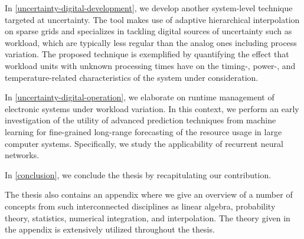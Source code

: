 In \cref{uncertainty-digital-development}, we develop another system-level
technique targeted at uncertainty. The tool makes use of adaptive hierarchical
interpolation on sparse grids and specializes in tackling digital sources of
uncertainty such as workload, which are typically less regular than the analog
ones including process variation. The proposed technique is exemplified by
quantifying the effect that workload units with unknown processing times have on
the timing-, power-, and temperature-related characteristics of the system under
consideration.

In \cref{uncertainty-digital-operation}, we elaborate on runtime management of
electronic systems under workload variation. In this context, we perform an
early investigation of the utility of advanced prediction techniques from
machine learning for fine-grained long-range forecasting of the resource usage
in large computer systems. Specifically, we study the applicability of recurrent
neural networks.

In \cref{conclusion}, we conclude the thesis by recapitulating our contribution.

The thesis also contains an appendix where we give an overview of a number of
concepts from such interconnected disciplines as linear algebra, probability
theory, statistics, numerical integration, and interpolation. The theory given
in the appendix is extensively utilized throughout the thesis.
